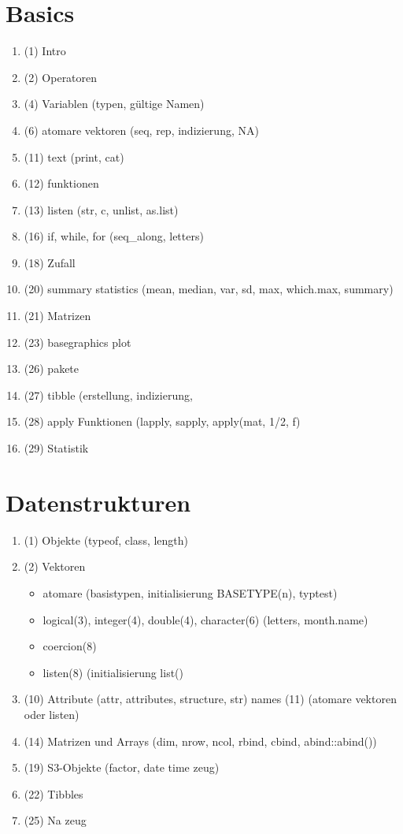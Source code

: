 \documentclass{article}
\begin{document}
\section{Basics}
\begin{enumerate}
    \item (1) Intro
    \item (2) Operatoren
    \item (4) Variablen (typen, gültige Namen)
    \item (6) atomare vektoren (seq, rep, indizierung, NA)
    \item (11) text (print, cat)
    \item (12) funktionen
    \item (13) listen (str, c, unlist, as.list)
    \item (16) if, while, for (seq\_along, letters)
    \item (18) Zufall
    \item (20) summary statistics (mean, median, var, sd, max, which.max, summary)
    \item (21) Matrizen
    \item (23) basegraphics plot
    \item (26) pakete
    \item (27) tibble (erstellung, indizierung, 
    \item (28) apply Funktionen (lapply, sapply, apply(mat, 1/2, f)
    \item (29) Statistik
\end{enumerate}


\section{Datenstrukturen}
\begin{enumerate}
    \item (1) Objekte (typeof, class, length)
    \item (2) Vektoren 
    \begin{itemize}
        \item atomare (basistypen, initialisierung BASETYPE(n), typtest)
        \item logical(3), integer(4), double(4), character(6) (letters, month.name)
        \item coercion(8)
        \item listen(8) (initialisierung list()
    \end{itemize}
    \item (10) Attribute (attr, attributes, structure, str)
    \subitem names (11) (atomare vektoren oder listen)
    \item (14) Matrizen und Arrays (dim, nrow, ncol, rbind, cbind, abind::abind())
    \item (19) S3-Objekte (factor, date time zeug)
    \item (22) Tibbles
    \item (25) Na zeug
\end{enumerate}
\end{document}
